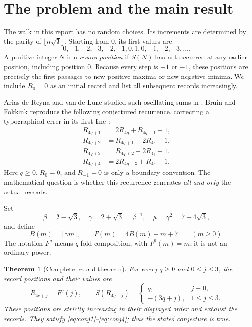 \documentclass[11pt]{article}
\newtheorem{theorem}{Theorem}[section]
\theoremstyle{definition}
\numberwithin{equation}{section}
\begin{document}
\section{The problem and the main result}\label{sec:problem}
The walk in this report has no random choices. Its increments are determined by the parity of $\lfloor n\sqrt3\rfloor$. Starting from $0$, its first values are
\[
0,-1,-2,-3,-2,-1,0,1,0,-1,-2,-3,\ldots.
\]
A positive integer $N$ is a \emph{record position} if $S(N)$ has not occurred at any earlier position, including position $0$. Because every step is $+1$ or $-1$, these positions are precisely the first passages to new positive maxima or new negative minima. We include $R_0=0$ as an initial record and list all subsequent records increasingly.

Arias de Reyna and van de Lune studied such oscillating sums in \cite{ARL}. Bruin and Fokkink reproduce the following conjectured recurrence, correcting a typographical error in its first line \cite[Section~2, p.~7]{BF}:
\begin{align}
 R_{4q+1}&=2R_{4q}+R_{4q-1}+1,\label{eq:conj1}\\
 R_{4q+2}&=R_{4q+1}+2R_{4q}+1,\label{eq:conj2}\\
 R_{4q+3}&=R_{4q+2}+2R_{4q}+1,\label{eq:conj3}\\
 R_{4q+4}&=2R_{4q+3}+R_{4q}+1.\label{eq:conj4}
\end{align}
Here $q\ge0$, $R_0=0$, and $R_{-1}=0$ is only a boundary convention. The mathematical question is whether this recurrence generates \emph{all and only} the actual records.

Set
\begin{equation}\label{eq:constants}
 \beta=2-\sqrt3,\quad \gamma=2+\sqrt3=\beta^{-1},\quad
 \mu=\gamma^2=7+4\sqrt3,
\end{equation}
and define
\begin{equation}\label{eq:BFdef}
 B(m)=\lfloor\gamma m\rfloor,\qquad
 F(m)=4B(m)-m+7\qquad(m\ge0).
\end{equation}
The notation $F^q$ means $q$-fold composition, with $F^0(m)=m$; it is not an ordinary power.

\begin{theorem}[Complete record theorem]\label{thm:main}
For every $q\ge0$ and $0\le j\le3$, the record positions and their values are
\begin{equation}\label{eq:main}
 R_{4q+j}=F^q(j),\qquad
 S(R_{4q+j})=
 \begin{cases}q,&j=0,\\-(3q+j),&1\le j\le3.\end{cases}
\end{equation}
These positions are strictly increasing in their displayed order and exhaust the records. They satisfy \eqref{eq:conj1}--\eqref{eq:conj4}; thus the stated conjecture is true.
\end{theorem}
\end{document}
